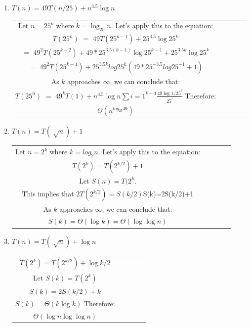 \documentclass{article}
\begin{document}
\begin{enumerate}[label=(\alph*)]
            \item $T(n)=49T(n/25)+n^3.5\log{n}$
            	\begin{center}
            		\begin{tabular}{c c c c c}
            		 Let $n=25^k$ where $k=\log_{25}n$. Let's apply this to the equation:\\
					$T(25^n)$ $=$ $49T(25^{k-1})+25^{3.5}\log{25^{k}}$\\
                    $=$ $49^2T(25^{k-2})+49*25^{3.5(k-1)}\log{{25}^{k-1}}+25^{3.5k}\log{25^{k}}$\\
                    $=$ $49^2T(25^{k-1})+25^{3.5k}log{25^k}(49*25^{-3.5}log{25^{-1}}+1)$\\
                    As $k$ approaches $\infty$, we can conclude that:\\
                    $T(25^n)$ $=$ $49^kT(1)+n^{3.5}\log{n}\sum{i=1}^{k-1}{\frac{49\log{1/25^i}}{25^i}}$
                    Therefore:\\
                    $\Theta(n^{log_{25}{49}})$
            		\end{tabular}
            	\end{center}
          \item $T(n)=T(\sqrt[]{n})+1$
          	\begin{center}
          		\begin{tabular}{c c c c c}
          		Let $n=2^k$ where $k=log_{2}n$. Let's apply this to the equation:\\
                $T(2^k)=T(2^{k/2})+1$\\
                Let $S(n)=T(2^{k}$.\\
                This implies that $2T(2^{k/2})=S(k/2)
                $S(k)=2S(k/2)+1\\
                 As $k$ approaches $\infty$, we can conclude that:\\
                 $S(k)=\Theta(\log{k})=\Theta(\log\log{n})$
          		\end{tabular}
          	\end{center}
            \item $T(n)=T(\sqrt[]{n})+\log{n}$
            	\begin{center}
            		\begin{tabular}{c c c c c}
            			$T(2^k)=T(2^{k/2})+\log{k/2}$\\
                        Let $S(k)=T(2^k)$\\
                       $S(k)=2S(k/2)+k$\\
                       $S(k)=\Theta(k\log{k})$
                       Therefore:\\
                       $\Theta(\log{n}\log{\log{n}})$\\
            		\end{tabular}
            	\end{center}
\end{enumerate}
\end{document}
